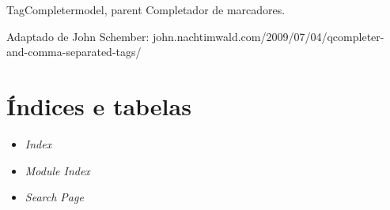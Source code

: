 \documentclass[letterpaper,10pt,portuguese]{manual}
\begin{document}
\hypertarget{veliger.TagCompleter}{}\begin{classdesc}{TagCompleter}{model, parent}
Completador de marcadores.

Adaptado de John Schember:
john.nachtimwald.com/2009/07/04/qcompleter-and-comma-separated-tags/
\end{classdesc}


\chapter{Índices e tabelas}
\begin{itemize}
\item {} 
\emph{Index}

\item {} 
\emph{Module Index}

\item {} 
\emph{Search Page}

\end{itemize}


\renewcommand{\indexname}{Índice do Módulo}
\printmodindex
\renewcommand{\indexname}{Índice}
\printindex
\end{document}
